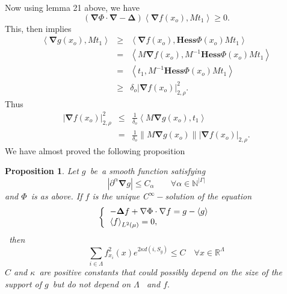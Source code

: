 \documentclass{article}
\newtheorem{proposition}[theorem]{Proposition}
\begin{document}
Now using lemma 21 above, we have%
\begin{equation*}
\left( \mathbf{\nabla }\Phi \cdot \mathbf{\nabla }-\mathbf{\Delta }\right)
\left\langle \mathbf{\nabla }f(x_{o}),Mt_{1}\right\rangle \geq 0.
\end{equation*}%
This, then implies 
\begin{eqnarray*}
\left\langle \mathbf{\nabla }g(x_{o}),Mt_{1}\right\rangle &\geq
&\left\langle \mathbf{\nabla }f(x_{o}),\mathbf{Hess}\Phi
(x_{o})Mt_{1}\right\rangle \\
&=&\left\langle M\mathbf{\nabla }f(x_{o}),M^{-1}\mathbf{Hess}\Phi
(x_{o})Mt_{1}\right\rangle \\
&=&\left\langle t_{1},M^{-1}\mathbf{Hess}\Phi (x_{o})Mt_{1}\right\rangle \\
&\geq &\delta _{o}\left| \mathbf{\nabla }f(x_{o})\right| _{2,\rho }^{2}.
\end{eqnarray*}%
Thus%
\begin{eqnarray*}
\left| \mathbf{\nabla }f(x_{o})\right| _{2,\rho }^{2} &\leq &\frac{1}{\delta
_{o}}\left\langle M\mathbf{\nabla }g(x_{o}),t_{1}\right\rangle \\
&=&\frac{1}{\delta _{o}}\left\| M\mathbf{\nabla }g(x_{o})\right\| \left| 
\mathbf{\nabla }f(x_{o})\right| _{2,\rho }.
\end{eqnarray*}%
We have almost proved the following proposition

\begin{proposition}
\textit{Let }$g$\textit{\ be\ a smooth function satisfying}%
\begin{equation}
\left| \partial ^{\alpha }\mathbf{\nabla }g\right| \leq C_{\alpha
}\;\;\;\;\;\;\;\forall \alpha \in \mathbb{N}^{\left| \Gamma \right| }
\end{equation}%
and $\Phi $\textit{\ is as above. If }$f$ is \textit{the unique C}$^{\infty
}-$\textit{solution of the equation }%
\begin{equation*}
\left\{ 
\begin{tabular}{l}
$-\mathbf{\Delta }f+\mathbf{\nabla }\Phi \cdot \mathbf{\nabla }%
f=g-\left\langle g\right\rangle $ \\ 
$\left\langle f\right\rangle _{L^{2}(\mu )}=0,$%
\end{tabular}%
\right.
\end{equation*}%
\textit{\ then}%
\begin{equation*}
\sum_{i\in \Lambda }f_{x_{i}}^{2}(x)e^{2\kappa d(i,S_{g})}\leq C\;\;\ \
\forall x\in \mathbb{R}^{\Lambda }
\end{equation*}%
$C$ and $\kappa $\textit{\ are positive constants that could possibly depend
on the size of the support of }$g$\textit{\ but do not depend on }$\Lambda $%
\textit{\ and }$f.$
\end{proposition}
\end{document}
